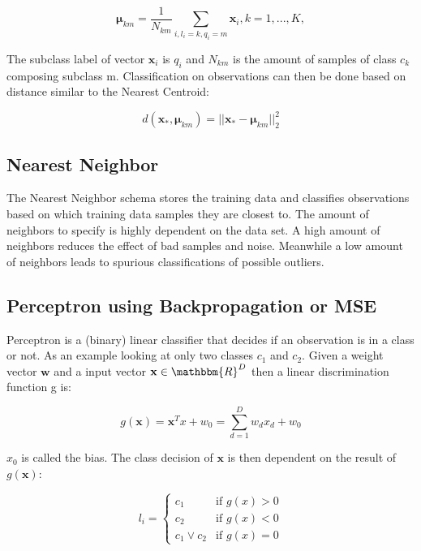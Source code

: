 \begin{equation}
    \mathbf{\mu}_{km} = \frac{1}{N_{km}} \sum_{i,l_i=k, q_i=m}{\mathbf{x}_i}, k=1,...,K,
\end{equation}

The subclass label of vector $\mathbf{x}_i$ is $q_i$ and $N_{km}$ is the amount of samples of class $c_k$ composing subclass m. Classification on observations can then be done based on distance similar to the Nearest Centroid: 

\begin{equation}
    d(\mathbf{x}_*, \mathbf{\mu}_{km}) = ||\mathbf{x}_*-\mathbf{\mu}_{km}||^2_2
\end{equation}

\subsection{Nearest Neighbor}
The Nearest Neighbor schema stores the training data and classifies observations based on which training data samples they are closest to. The amount of neighbors to specify is highly dependent on the data set. A high amount of neighbors reduces the effect of bad samples and noise\cite{nearest-neighbor}. Meanwhile a low amount of neighbors leads to spurious classifications of possible outliers. 

\subsection{Perceptron using Backpropagation or MSE}
Perceptron is a (binary) linear classifier that decides if an observation is in a class or not. As an example looking at only two classes $c_1$ and $c_2$. Given a weight vector $\mathbf{w}$ and a input vector $\mathbf{x}\in\mathbbm{R}^D$ then a linear discrimination function g is: 

\begin{equation}
    g(\mathbf{x})=\mathbf{x}^Tx + w_0 = \sum_{d=1}^D{w_dx_d+w_0}
\end{equation}

$x_0$ is called the bias. The class decision of $\mathbf{x}$ is then dependent on the result of $g(\mathbf{x})$: 

\begin{equation}
    l_i=
    \begin{cases}
        c_1& \text{if $g(x)>0$} \\
        c_2& \text{if $g(x)<0$}  \\
        c_1 \lor c_2& \text{if $g(x)=0$}
    \end{cases}
\end{equation}

